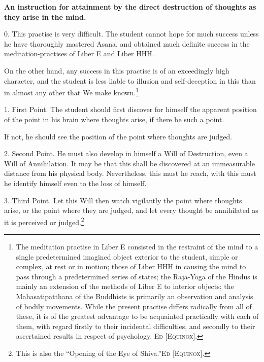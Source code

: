 
\textbf{An instruction for attainment by the direct destruction of thoughts as they arise in the mind.}

0. This practise is very difficult. The student cannot hope for much success unless he have thoroughly mastered Asana, and obtained much definite success in the meditation-practises of Liber E and Liber HHH.

On the other hand, any success in this practise is of an exceedingly high character, and the student is less liable to illusion and self-deception in this than in almost any other that We make known.\footnote{The meditation practise in Liber E consisted in the restraint of the mind to a single predetermined imagined object exterior to the student, simple or complex, at rest or in motion; those of Liber HHH in causing the mind to pass through a predetermined series of states; the Raja-Yoga of the Hindus is mainly an extension of the methods of Liber Ε to interior objects; the Mahasatipatthana of the Buddhists is primarily an observation and analysis of bodily movements. While the present practise differs radically from all of these, it is of the greatest advantage to be acquainted practically with each of them, with regard firstly to their incidental difficulties, and secondly to their ascertained results in respect of psychology. \textsc{Ed [Equinox]}.}

1. First Point. The student should first discover for himself the apparent position of the point in his brain where thoughts arise, if there be such a point.

If not, he should see the position of the point where thoughts are judged.

2. Second Point. He must also develop in himself a Will of Destruction, even a Will of Annihilation. It may be that this shall be discovered at an immeasurable distance from his physical body. Nevertheless, this must he reach, with this must he identify himself even to the loss of himself.

3. Third Point. Let this Will then watch vigilantly the point where thoughts arise, or the point where they are judged, and let every thought be annihilated as it is perceived or judged.\footnote{This is also the \enquote{Opening of the Eye of Shiva.}\footnotemark \textsc{Ed [Equinox]}.}

